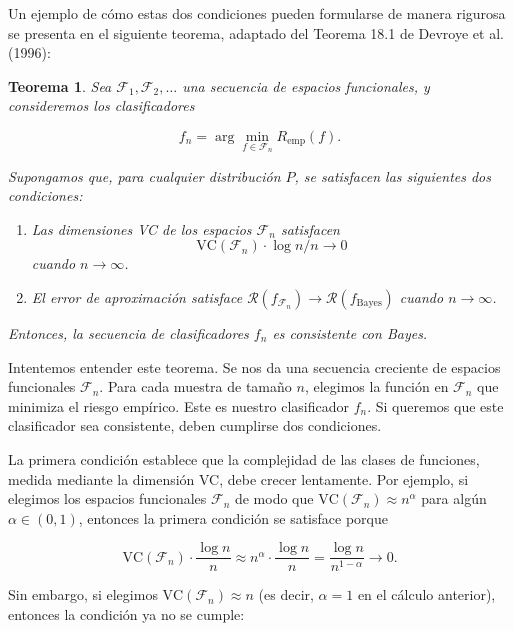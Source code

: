 \documentclass{article}
\newtheorem{thm}{Teorema}[subsection]
\begin{document}
Un ejemplo de cómo estas dos condiciones pueden formularse de manera rigurosa se presenta en el 
siguiente teorema, adaptado del Teorema 18.1 de Devroye et al. (1996):\newline

\begin{thm}
 Sea \(\mathcal{F}_1, \mathcal{F}_2, \dots\) una secuencia de espacios funcionales, y 
consideremos los clasificadores 

\[
f_n = \arg\min_{f \in \mathcal{F}_n} R_{\text{emp}}(f).
\]

Supongamos que, para cualquier distribución \(P\), se satisfacen las siguientes dos condiciones:

\begin{enumerate}
    \item Las dimensiones VC de los espacios \(\mathcal{F}_n\) satisfacen 
    \[
    \text{VC}(\mathcal{F}_n) \cdot \log n / n \to 0
    \]
    cuando \(n \to \infty\).
    
    \item El error de aproximación satisface \(\mathcal{R}(f_{\mathcal{F}_n}) \to \mathcal{R}(f_{\text{Bayes}})\) 
    cuando \(n \to \infty\).
\end{enumerate}

Entonces, la secuencia de clasificadores \(f_n\) es consistente con Bayes.

\end{thm}
\vspace{0.3cm}

Intentemos entender este teorema. Se nos da una secuencia creciente de espacios funcionales \(\mathcal{F}_n\). 
Para cada muestra de tamaño \(n\), elegimos la función en \(\mathcal{F}_n\) que minimiza el riesgo empírico. 
Este es nuestro clasificador \(f_n\). Si queremos que este clasificador sea consistente, deben cumplirse dos 
condiciones.\newline

La primera condición establece que la complejidad de las clases de funciones, medida mediante la dimensión VC, 
debe crecer lentamente. Por ejemplo, si elegimos los espacios funcionales \(\mathcal{F}_n\) de modo que 
\(\text{VC}(\mathcal{F}_n) \approx n^\alpha\) para algún \(\alpha \in (0,1)\), entonces la primera condición 
se satisface porque

\[
\text{VC}(\mathcal{F}_n) \cdot \frac{\log n}{n} \approx n^\alpha \cdot \frac{\log n}{n} = \frac{\log n}{n^{1-\alpha}} \to 0.
\]

Sin embargo, si elegimos \(\text{VC}(\mathcal{F}_n) \approx n\) (es decir, \(\alpha = 1\) en el cálculo anterior), 
entonces la condición ya no se cumple:
\end{document}
